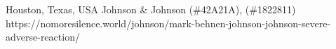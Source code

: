           {
            Houston, Texas, USA
          }
          {
          }
          {
            Johnson \& Johnson
          }
          {
             (\#42A21A),
             (\#1822811)
          }
          {
          }
          {
            https://nomoresilence.world/johnson/mark-behnen-johnson-johnson-severe-adverse-reaction/
          }

